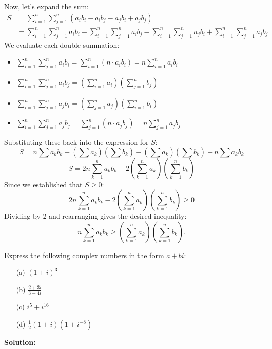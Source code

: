 Now, let's expand the sum:
\begin{align*}
S &= \sum_{i=1}^n \sum_{j=1}^n (a_i b_i - a_i b_j - a_j b_i + a_j b_j) \\
&= \sum_{i=1}^n \sum_{j=1}^n a_i b_i - \sum_{i=1}^n \sum_{j=1}^n a_i b_j - \sum_{i=1}^n \sum_{j=1}^n a_j b_i + \sum_{i=1}^n \sum_{j=1}^n a_j b_j
\end{align*}
We evaluate each double summation:
\begin{itemize}
\item \( \sum_{i=1}^n \sum_{j=1}^n a_i b_i = \sum_{i=1}^n \left( n \cdot a_i b_i \right) = n \sum_{i=1}^n a_i b_i \)
\item \( \sum_{i=1}^n \sum_{j=1}^n a_i b_j = \left( \sum_{i=1}^n a_i \right) \left( \sum_{j=1}^n b_j \right) \)
\item \( \sum_{i=1}^n \sum_{j=1}^n a_j b_i = \left( \sum_{j=1}^n a_j \right) \left( \sum_{i=1}^n b_i \right) \)
\item \( \sum_{i=1}^n \sum_{j=1}^n a_j b_j = \sum_{j=1}^n \left( n \cdot a_j b_j \right) = n \sum_{j=1}^n a_j b_j \)
\end{itemize}
Substituting these back into the expression for $S$:
\[
S = n \sum a_k b_k - \left(\sum a_k\right)\left(\sum b_k\right) - \left(\sum a_k\right)\left(\sum b_k\right) + n \sum a_k b_k
\]
\[
S = 2n \sum_{k=1}^n a_k b_k - 2 \left( \sum_{k=1}^n a_k \right) \left( \sum_{k=1}^n b_k \right)
\]
Since we established that $S \geq 0$:
\[
2n \sum_{k=1}^n a_k b_k - 2 \left( \sum_{k=1}^n a_k \right) \left( \sum_{k=1}^n b_k \right) \geq 0
\]
Dividing by 2 and rearranging gives the desired inequality:
\[
n \sum_{k=1}^n a_k b_k \geq \left( \sum_{k=1}^n a_k \right) \left( \sum_{k=1}^n b_k \right).
\]

\begin{problembox}
Express the following complex numbers in the form \( a + bi \):

\begin{enumerate}
\item[(a)] \( (1 + i)^3 \)
\item[(b)] \( \frac{2 + 3i}{3 - 4i} \)
\item[(c)] \( i^5 + i^{16} \)
\item[(d)] \( \frac{1}{2}(1 + i)(1 + i^{-8}) \)
\end{enumerate}
\end{problembox}

\textbf{Solution:}

